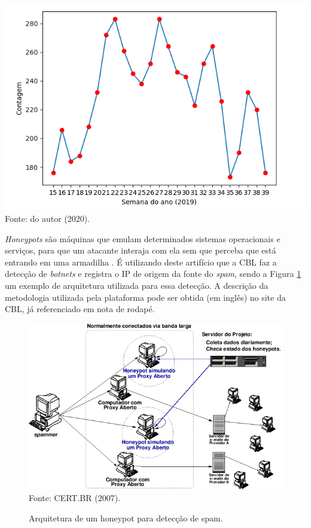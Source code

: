     \begin{grafico}[!htb]
        \centering
        \caption{Contagem de IPs do AS listados na CBL entre abril e setembro de 2019.} 
        \label{fig:plot_blacklist} 
        \includegraphics[scale=0.5]{img/plot_blacklist.png} \\
        {\small Fonte: do autor (2020).} 
    \end{grafico}
    
    \textit{Honeypots} são máquinas que emulam determinados sistemas operacionais e serviços, para que um atacante interaja com ela sem que perceba que está entrando em uma armadilha \cite{spampots2007}. É utilizando deste artifício que a CBL faz a detecção de \textit{botnets} e registra o IP de origem da fonte do \textit{spam}, sendo a Figura \ref{fig:honeypot} um exemplo de arquitetura utilizada para essa detecção. A descrição da metodologia utilizada pela plataforma pode ser obtida (em inglês) no site da CBL, já referenciado em nota de rodapé. 
    
    \begin{figure}[!htb]
        \centering
        \caption{Arquitetura de um honeypot para detecção de spam.} 
        \label{fig:honeypot} 
        \includegraphics[scale=0.8]{img/honeypot.png} \\
        {\small Fonte: CERT.BR (2007).} 
    \end{figure}
    
